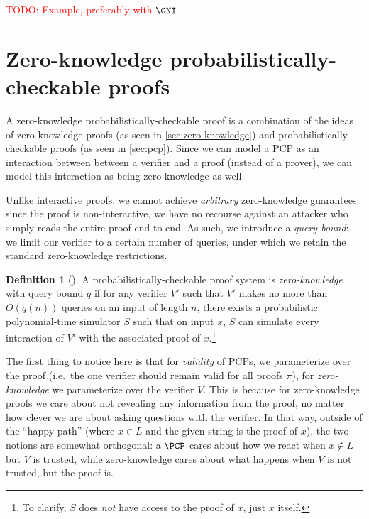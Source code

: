 \documentclass[english,12pt]{reedthesis}
\theoremstyle{plain}
\theoremstyle{definition}
\newtheorem{defn}[defn]{Definition}
\theoremstyle{remark}
\newcommand{\TODO}[1]{\textcolor{red}{TODO: #1}}
\begin{document}
\TODO{Example, preferably with $\GNI$}

\section{Zero-knowledge probabilistically-checkable proofs}\label{sec:pzkpcp}

A zero-knowledge probabilistically-checkable proof is a combination of the ideas
of zero-knowledge proofs (as seen in \cref{sec:zero-knowledge}) and
probabilistically-checkable proofs (as seen in \cref{sec:pcp}). Since we can
model a PCP as an interaction between between a verifier and a proof (instead of
a prover), we can model this interaction as being zero-knowledge as well.

Unlike interactive proofs, we cannot achieve \emph{arbitrary} zero-knowledge
guarantees: since the proof is non-interactive, we have no recourse against an
attacker who simply reads the entire proof end-to-end. As such, we introduce a
\emph{query bound}: we limit our verifier to a certain number
of queries, under which we retain the standard zero-knowledge restrictions.

\begin{defn}[{\cite[Def.\ 8.6]{GOS24}}]\label{def:pzkpcp}
  A probabilistically-checkable proof system is \emph{zero-knowledge} with query
  bound $q$ if for any verifier $V'$ such that $V'$ makes no more than $O(q(n))$
  queries on an input of length $n$, there exists a probabilistic
  polynomial-time simulator $S$ such that on input $x$, $S$ can simulate every
  interaction of $V'$ with the associated proof of $x$.\footnote{To clarify, $S$
    does \emph{not} have access to the proof of $x$, just $x$ itself.}
\end{defn}

The first thing to notice here is that for \emph{validity} of PCPs, we
parameterize over the proof (i.e.\ the one verifier should remain valid for all
proofs $\pi$), for \emph{zero-knowledge} we parameterize over the verifier $V$.
This is because for zero-knowledge proofs we care about not revealing any
information from the proof, no matter how clever we are about asking questions
with the verifier. In that way, outside of the ``happy path'' (where $x \in L$ and
the given string is the proof of $x$), the two notions are somewhat orthogonal:
a $\PCP$ cares about how we react when $x \notin L$ but $V$ is trusted, while
zero-knowledge cares about what happens when $V$ is not trusted, but the proof
is.
\end{document}
